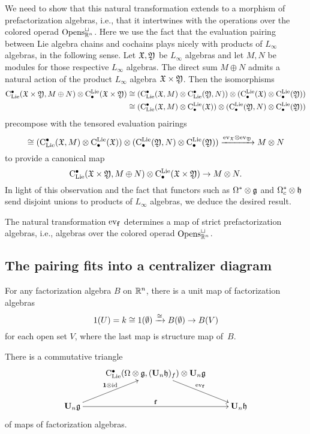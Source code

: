 \documentclass[11pt]{amsart}
\numberwithin{equation}{section}
\begin{document}
We need to show that this natural transformation extends to a morphism of prefactorization algebras,
i.e., that it intertwines with the operations over the colored operad ${\rm Opens}_{\mathbb R^n}^\sqcup$.
Here we use the fact that the evaluation pairing between Lie algebra chains and cochains plays nicely with products of $L_\infty$ algebras, in the following sense.
Let $\mathfrak X, \mathfrak Y$ be $L_\infty$ algebras and let $M, N$ be modules for those respective $L_\infty$ algebras.
The direct sum $M \oplus N$ admits a natural action of the product $L_\infty$ algebra $\mathfrak X \times \mathfrak Y$.
Then the isomorphisms
\begin{align*}
{\rm C}_{\rm Lie}^\bullet(\mathfrak X \times \mathfrak Y, M \oplus N) \otimes {\rm C}^{\rm Lie}_\bullet(\mathfrak X \times \mathfrak Y) 
&\cong ({\rm C}_{\rm Lie}^\bullet(\mathfrak X, M) \otimes {\rm C}_{\rm Lie}^\bullet(\mathfrak Y,N) ) \otimes ({\rm C}^{\rm Lie}_\bullet(\mathfrak X) \otimes {\rm C}^{\rm Lie}_\bullet(\mathfrak Y) ) \\
&\cong ({\rm C}_{\rm Lie}^\bullet(\mathfrak X,M) \otimes {\rm C}^{\rm Lie}_\bullet(\mathfrak X) ) \otimes ({\rm C}^{\rm Lie}_\bullet(\mathfrak Y,N) \otimes {\rm C}^{\rm Lie}_\bullet(\mathfrak Y) )
\end{align*}
precompose with the tensored evaluation pairings
\[
\cong ({\rm C}_{\rm Lie}^\bullet(\mathfrak X,M) \otimes {\rm C}^{\rm Lie}_\bullet(\mathfrak X) ) \otimes ({\rm C}^{\rm Lie}_\bullet(\mathfrak Y,N) \otimes {\rm C}^{\rm Lie}_\bullet(\mathfrak Y) ) \xrightarrow{{\rm ev}_\mathfrak X \otimes {\rm ev}_\mathfrak Y} M \otimes N
\]
to provide a canonical map
\[
{\rm C}_{\rm Lie}^\bullet(\mathfrak X \times \mathfrak Y, M \oplus N) \otimes {\rm C}^{\rm Lie}_\bullet(\mathfrak X \times \mathfrak Y) \to M \otimes N.
\]
In light of this observation and the fact that functors such as $\Omega^* \otimes \mathfrak g$ and $\Omega^*_c \otimes \mathfrak h$ send disjoint unions to products of $L_\infty$ algebras,
we deduce the desired result.

\begin{lmm}
\label{L:pairingCE}
The natural transformation ${\rm ev}_{{\bf f}}$ determines a map of strict prefactorization algebras,
i.e., algebras over the colored operad ${\rm Opens}_{\mathbb R^n}^\sqcup$.
\end{lmm}

\subsection{The pairing fits into a centralizer diagram}

For any factorization algebra $B$ on $\mathbb R^n$, 
there is a unit map of factorization algebras  
\[
1(U) = k \cong 1(\emptyset)  \xrightarrow{\cong}
B(\emptyset) \to B(V)  
\] 
for each open set $V$, where the last map is structure map of~$B$. 

\begin{lmm}\label{L:ComTriangCent} 
There is a commutative triangle 
\[
\xymatrix{
& \clies ( \Omega \otimes \fg , (\bU_n \fh)_f) \otimes \bU_n \fg
\ar[dr]^{\ev_{{\bf f}}} & \\
\bU_n \fg \ar[ur]^{\mathbf{1} \otimes \id} \ar[rr]^{\mathbf{f}}  & &  \bU_n \fh}
\]
of maps of factorization algebras.
\end{lmm}
\end{document}
